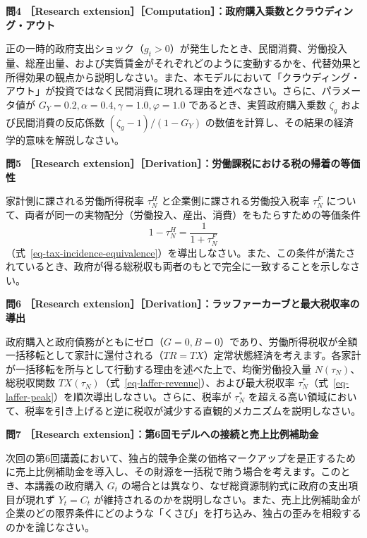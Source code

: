 \documentclass[
  japanese,
  lualatex,
  ja=standard,
  12pt,
  a4paper]{ltjsarticle}
\begin{document}
\textbf{問4 ［Research
extension］［Computation］：政府購入乗数とクラウディング・アウト}

正の一時的政府支出ショック（\(g_t > 0\)）が発生したとき、民間消費、労働投入量、総産出量、および実質賃金がそれぞれどのように変動するかを、代替効果と所得効果の観点から説明しなさい。また、本モデルにおいて「クラウディング・アウト」が投資ではなく民間消費に現れる理由を述べなさい。さらに、パラメータ値が
\(G_Y = 0.2, \alpha = 0.4, \gamma = 1.0, \varphi = 1.0\)
であるとき、実質政府購入乗数 \(\zeta_g\) および民間消費の反応係数
\((\zeta_g - 1)/(1-G_Y)\)
の数値を計算し、その結果の経済学的意味を解説しなさい。

\textbf{問5 ［Research
extension］［Derivation］：労働課税における税の帰着の等価性}

家計側に課される労働所得税率 \(\tau_N^H\) と企業側に課される労働投入税率
\(\tau_N^F\)
について、両者が同一の実物配分（労働投入、産出、消費）をもたらすための等価条件
\[
1 - \tau_N^H = \frac{1}{1+\tau_N^F}
\]
（式~\ref{eq-tax-incidence-equivalence}）を導出しなさい。また、この条件が満たされているとき、政府が得る総税収も両者のもとで完全に一致することを示しなさい。

\textbf{問6 ［Research
extension］［Derivation］：ラッファーカーブと最大税収率の導出}

政府購入と政府債務がともにゼロ（\(G = 0, B = 0\)）であり、労働所得税収が全額一括移転として家計に還付される（\(TR = TX\)）定常状態経済を考えます。各家計が一括移転を所与として行動する理由を述べた上で、均衡労働投入量
\(N(\tau_N)\)、総税収関数
\(TX(\tau_N)\)（式~\ref{eq-laffer-revenue}）、および最大税収率
\(\tau_N^*\)（式~\ref{eq-laffer-peak}）を順次導出しなさい。さらに、税率が
\(\tau_N^*\)
を超える高い領域において、税率を引き上げると逆に税収が減少する直観的メカニズムを説明しなさい。

\textbf{問7 ［Research extension］：第6回モデルへの接続と売上比例補助金}

次回の第6回講義において、独占的競争企業の価格マークアップを是正するために売上比例補助金を導入し、その財源を一括税で賄う場合を考えます。このとき、本講義の政府購入
\(G_t\) の場合とは異なり、なぜ総資源制約式に政府の支出項目が現れず
\(Y_t = C_t\)
が維持されるのかを説明しなさい。また、売上比例補助金が企業のどの限界条件にどのような「くさび」を打ち込み、独占の歪みを相殺するのかを論じなさい。
\end{document}
